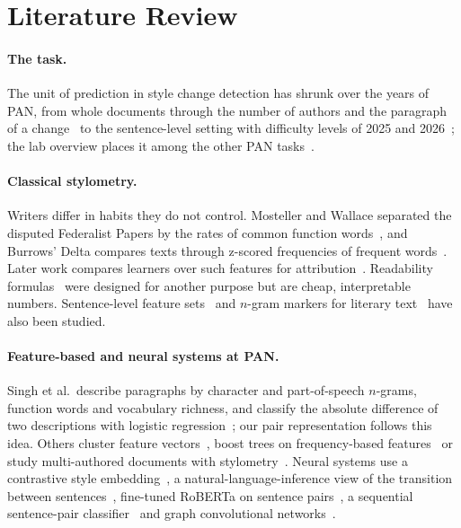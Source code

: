 \documentclass[runningheads]{llncs}
\begin{document}
\section{Literature Review}
\label{sec:related}

\paragraph{The task.} The unit of prediction in style change detection has shrunk over the years of PAN, from whole documents through the number of authors and the paragraph of a change~\cite{zangerle2020overview,bevendorff2021overview} to the sentence-level setting with difficulty levels of 2025 and 2026~\cite{zangerle2025overview,zangerle:2026}; the lab overview places it among the other PAN tasks~\cite{bevendorff:2026b}.

\paragraph{Classical stylometry.} Writers differ in habits they do not control. Mosteller and Wallace separated the disputed Federalist Papers by the rates of common function words~\cite{mosteller1964inference}, and Burrows' Delta compares texts through z-scored frequencies of frequent words~\cite{burrows2002delta}. Later work compares learners over such features for attribution~\cite{10.1093/llc/fqq001}. Readability formulas~\cite{flesch1948new,gunning1952technique,kincaid1975derivation} were designed for another purpose but are cheap, interpretable numbers. Sentence-level feature sets~\cite{oloo2022optimal} and $n$-gram markers for literary text~\cite{rios2022detection} have also been studied.

\paragraph{Feature-based and neural systems at PAN.} Singh et al.\ describe paragraphs by character and part-of-speech $n$-grams, function words and vocabulary richness, and classify the absolute difference of two descriptions with logistic regression~\cite{singh2021writing}; our pair representation follows this idea. Others cluster feature vectors~\cite{alshamasi2022ensemble}, boost trees on frequency-based features~\cite{ochab2025styloch} or study multi-authored documents with stylometry~\cite{zamir2024stylometry}. Neural systems use a contrastive style embedding~\cite{chen2023writing}, a natural-language-inference view of the transition between sentences~\cite{kucukkaya2023arc}, fine-tuned RoBERTa on sentence pairs~\cite{rohra2025sentence}, a sequential sentence-pair classifier~\cite{schmidt2025team} and graph convolutional networks~\cite{alsheddi2025team}.
\end{document}
